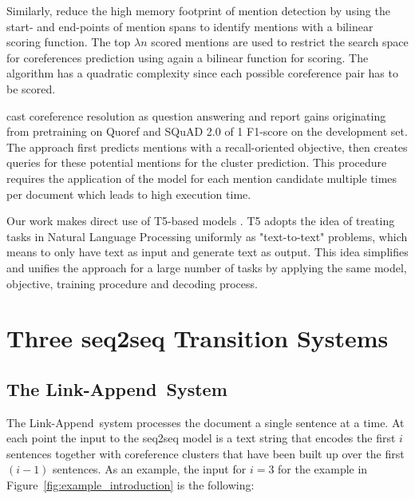 \documentclass[11pt,a4paper]{article}
\newcommand{\LA}{Link-Append}
\begin{document}
 Similarly,  reduce the high memory footprint of mention detection by using the start- and end-points of mention spans to identify mentions with a bilinear scoring function. The top $\lambda n$ scored mentions are used to restrict the search space for coreferences prediction using again a bilinear function for scoring. The algorithm has a quadratic complexity since each possible coreference pair has to be scored. 

 cast coreference resolution as question answering and report gains originating from pretraining on Quoref and SQuAD 2.0 of 1 F1-score on the development set. The approach first predicts mentions with a recall-oriented objective, then creates queries for these potential mentions for the cluster prediction. This procedure requires the application of the model for each mention candidate multiple times per document which leads to high execution time.  



Our work makes direct use of T5-based models  \cite{DBLP:journals/corr/abs-1910-10683}.
{\sc T5} adopts the idea of treating tasks in Natural Language Processing uniformly as "text-to-text" problems, which means to only have text as input and generate text as output. This idea simplifies and unifies the approach for a large number of tasks by applying the same model, objective, training procedure and decoding process.



\section{Three seq2seq Transition Systems}
\label{sec:systems}


\newcommand{\mi}{{\cal M}_i}
\newcommand{\mm}{{\cal M}}
\newcommand{\mli}{{\cal M}_{\leq i}}

\subsection{The \LA~System}

The \LA~system processes the document a single sentence at a time. At each point the input to the seq2seq model is a text string that encodes the first $i$ sentences together with coreference clusters that have been built up over the first $(i-1)$ sentences. As an example, the input for $i=3$ for the example in Figure~\ref{fig:example_introduction} is the following:
\end{document}
